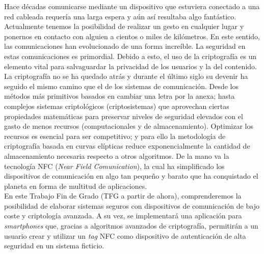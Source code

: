 \documentclass[../PFC.tex]{subfiles}
\begin{document}
Hace décadas comunicarse mediante un dispositivo que estuviera conectado a una red cableada requería una larga espera y aún así resultaba algo fantástico. Actualmente tenemos la posibilidad de realizar un gesto en cualquier lugar y ponernos en contacto con alguien a cientos o miles de kilómetros. En este sentido, las comunicaciones han evolucionado de una forma increíble. La seguridad en estas comunicaciones es primordial. Debido a esto, el uso de la criptografía es un elemento vital para salvaguardar la privacidad de los usuarios y la del contenido.\\

La criptografía no se ha quedado atrás y durante el último siglo su devenir ha seguido el mismo camino que el de los sistemas de comunicación. Desde los métodos más primitivos basados en cambiar una letra por la anexa; hasta complejos sistemas criptológicos (criptosistemas) que aprovechan ciertas propiedades matemáticas para preservar niveles de seguridad elevados con el gasto de menos recursos (computacionales y de almacenamiento). Optimizar los recursos es esencial para ser competitivo; y para ello la metodología de criptografía basada en curvas elípticas reduce exponencialmente la cantidad de almacenamiento necesaria respecto a otros algoritmos. De la mano va la tecnología NFC (\textit{Near Field Comunication}), la cual ha simplificado los dispositivos de comunicación en algo tan pequeño y barato que ha conquistado el planeta en forma de multitud de aplicaciones.\\

En este Trabajo Fin de Grado (TFG a partir de ahora), comprenderemos la posibilidad de elaborar sistemas seguros con dispositivos de comunicación de bajo coste y criptología avanzada. A su vez, se implementará una aplicación para \textit{smartphones} que, gracias a algoritmos avanzados de criptografía, permitirán a un usuario crear y utilizar un \textit{tag} NFC como dispositivo de autenticación de alta seguridad en un sistema ficticio.
\end{document}
